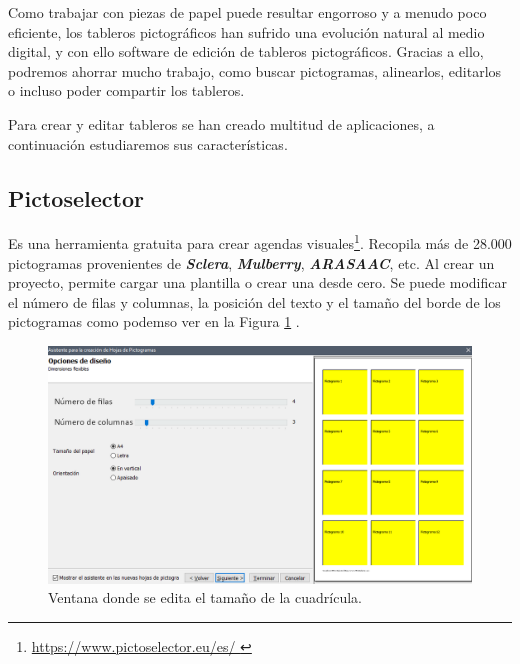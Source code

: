 Como trabajar con piezas de papel puede resultar engorroso y a menudo poco eficiente, los tableros pictográficos han sufrido una evolución natural al medio digital, y con ello software de edición de tableros pictográficos. Gracias a ello, podremos ahorrar mucho trabajo, como buscar pictogramas, alinearlos, editarlos o incluso poder compartir los tableros.


Para crear y editar tableros se han creado multitud de aplicaciones, a continuación estudiaremos sus características.



\subsection{Pictoselector}
Es una herramienta gratuita para crear agendas visuales\footnote{\url{ https://www.pictoselector.eu/es/ }}.  Recopila más de 28.000 pictogramas provenientes de \textbf{\textit{Sclera}}, \textbf{\textit{Mulberry}}, \textbf{\textit{ARASAAC}}, etc. Al crear un proyecto, permite cargar una plantilla o crear una desde cero. Se puede modificar el número de filas y columnas, la posición del texto y el tamaño del borde de los pictogramas como podemso ver en la Figura \ref{fig:pictoselector-tablero} .


\begin{figure}[h!]
	\centering
	\includegraphics[width=0.7\linewidth]{Imagenes/Bitmap/Pictoselector Tablero}
	\caption{Ventana donde se edita el tamaño de la cuadrícula.}
	\label{fig:pictoselector-tablero}
\end{figure}


